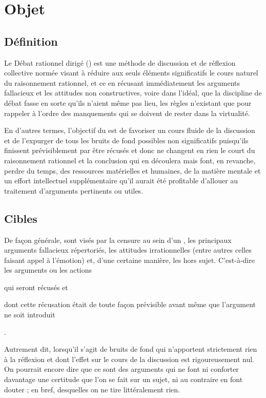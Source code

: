 \section{Objet}

\subsection{Définition}
Le Débat rationnel dirigé (\mainabbr{}) est une méthode de discussion et de réflexion collective normée visant à réduire aux seuls éléments significatifs le cours naturel du raisonnement rationnel, et ce en récusant immédiatement les arguments fallacieux et les attitudes non constructives, voire dans l’idéal, que la discipline de débat fasse en sorte qu’ils n’aient même pas lieu, les règles n’existant que pour rappeler à l’ordre des manquements qui se doivent de rester dans la virtualité.

En d’autres termes, l’objectif du \mainabbr{} est de favoriser un cours fluide de la discussion et de l’expurger de tous les bruits de fond possibles non significatifs puisqu’ils finissent prévisiblement par être récusés et donc ne changent en rien le court du raisonnement rationnel et la conclusion qui en découlera mais font, en revanche, perdre du temps, des ressources matérielles et humaines, de la matière mentale et un effort intellectuel supplémentaire qu’il aurait été profitable d’allouer au traitement d’arguments pertinents ou utiles.

\subsection{Cibles}
De façon générale, sont visés par la censure au sein d’un \mainabbr{}, les principaux arguments fallacieux répertoriés, les attitudes irrationnelles (entre autres celles faisant appel à l’émotion) et, d’une certaine manière, les hors sujet. C’est-à-dire les arguments ou les actions
\begin{SRlist}
 \item qui seront récusés
 et
 \item dont cette récusation était de toute façon prévisible avant même que l’argument ne soit introduit%
\end{SRlist}%
.

Autrement dit, lorsqu’il s’agit de bruits de fond qui n’apportent strictement rien à la réflexion et dont l’effet sur le cours de la discussion est rigoureusement nul. On pourrait encore dire que ce sont des arguments qui ne font ni conforter davantage une certitude que l’on se fait sur un sujet, ni au contraire en font douter ; en bref, desquelles on ne tire littéralement rien.

